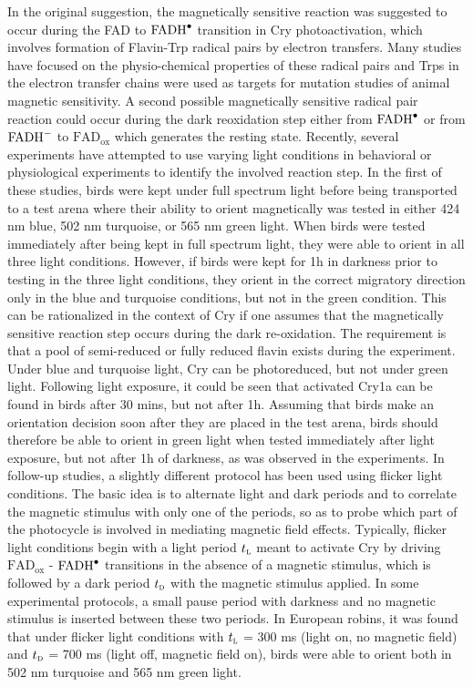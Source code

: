 \documentclass[twoside,twocolumn,9pt]{article}
\begin{document}
In the original suggestion, \cite{Ritz2000} the magnetically sensitive reaction was suggested to occur during the FAD to $\ce{FADH^{.}}$ transition in Cry photoactivation, which involves formation of Flavin-Trp radical pairs by electron transfers. Many studies have focused on the physio-chemical properties of these radical pairs \cite{Atkins2019, Solovyov2007, Biskup2009, Sheppard2017} and Trps in the electron transfer chains were used as targets for mutation studies of animal magnetic sensitivity. \cite{Gegear2010, Fedele2014} A second possible magnetically sensitive radical pair reaction could occur during the dark reoxidation step either from $\ce{FADH^{.}}$ or from $\ce{FADH^{-}}$ to $\text{FAD}_{\text{ox}}$ which generates the resting state. \cite{Ritz2009} Recently, several experiments have attempted to use varying light conditions in behavioral or physiological experiments to identify the involved reaction step. In the first of these studies, birds were kept under full spectrum light before being transported to a test arena where their ability to orient magnetically was tested in either 424 nm blue, 502 nm turquoise, or 565 nm green light. \cite{Wiltschko2014} When birds were tested immediately after being kept in full spectrum light, they were able to orient in all three light conditions. However, if birds were kept for 1h in darkness prior to testing in the three light conditions, they orient in the correct migratory direction only in the blue and turquoise conditions, but not in the green condition. This can be rationalized in the context of Cry if one assumes that the magnetically sensitive reaction step occurs during the dark re-oxidation. The requirement is that a pool of semi-reduced or fully reduced flavin exists during the experiment. Under blue and turquoise light, Cry can be photoreduced, but not under green light. Following light exposure, it could be seen that activated Cry1a can be found in birds after 30 mins, but not after 1h. \cite{Niessner2013, Niessner2014} Assuming that birds make an orientation decision soon after they are placed in the test arena, birds should therefore be able to orient in green light when tested immediately after light exposure, but not after 1h of darkness, as was observed in the experiments. \cite{Wiltschko2014} In follow-up studies, a slightly different protocol has been used using flicker light conditions. The basic idea is to alternate light and dark periods and to correlate the magnetic stimulus with only one of the periods, so as to probe which part of the photocycle is involved in mediating magnetic field effects. Typically, flicker light conditions begin with a light period $t_{\textsc{l}}$ meant to activate Cry by driving $\text{FAD}_{\text{ox}}$ - $\ce{FADH^{.}}$ transitions in the absence of a magnetic stimulus, which is followed by a dark period $t_{\textsc{d}}$ with the magnetic stimulus applied. In some experimental protocols, a small pause period with darkness and no magnetic stimulus is inserted between these two periods. In European robins, it was found that under flicker light conditions with $t_{\textsc{l}}$ = 300 ms (light on, no magnetic field) and $t_{\textsc{d}}$ = 700 ms (light off, magnetic field on), birds were able to orient both in 502 nm turquoise and 565 nm green light.  
\end{document}
